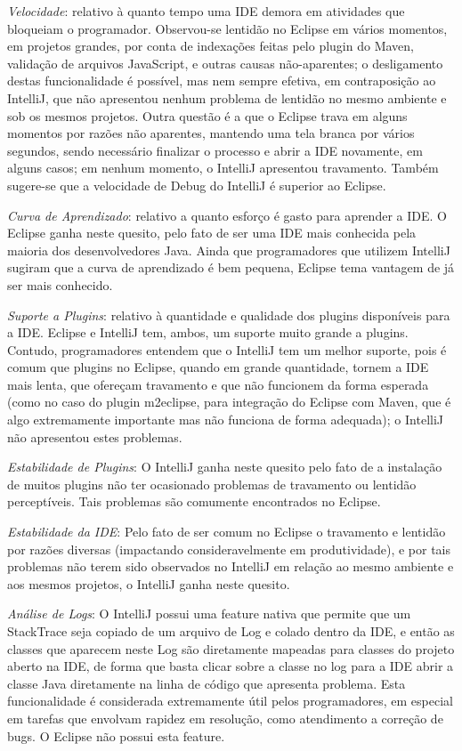 \documentclass[12pt,journal,compsoc]{IEEEtran}
\begin{document}
\emph{Velocidade}: relativo à quanto tempo uma IDE demora em atividades que bloqueiam o programador. Observou-se lentidão no Eclipse em vários momentos, em projetos grandes, por conta de indexações feitas pelo plugin do Maven, validação de arquivos JavaScript, e outras causas não-aparentes; o desligamento destas funcionalidade é possível, mas nem sempre efetiva, em contraposição ao IntelliJ, que não apresentou nenhum problema de lentidão no mesmo ambiente e sob os mesmos projetos. Outra questão é a que o Eclipse trava em alguns momentos por razões não aparentes, mantendo uma tela branca por vários segundos, sendo necessário finalizar o processo e abrir a IDE novamente, em alguns casos; em nenhum momento, o IntelliJ apresentou travamento. Também sugere-se\cite{dropped_eclipse} que a velocidade de Debug do IntelliJ é superior ao Eclipse.

\emph{Curva de Aprendizado}: relativo a quanto esforço é gasto para aprender a IDE. O Eclipse ganha neste quesito, pelo fato de ser uma IDE mais conhecida pela maioria dos desenvolvedores Java. Ainda que programadores que utilizem IntelliJ sugiram que a curva de aprendizado é bem pequena, Eclipse tema vantagem de já ser mais conhecido.

\emph{Suporte a Plugins}: relativo à quantidade e qualidade dos plugins disponíveis para a IDE. Eclipse e IntelliJ tem, ambos, um suporte muito grande a plugins. Contudo, programadores entendem que o IntelliJ tem um melhor suporte, pois é comum que plugins no Eclipse, quando em grande quantidade, tornem a IDE mais lenta, que ofereçam travamento e que não funcionem da forma esperada (como no caso do plugin m2eclipse, para integração do Eclipse com Maven, que é algo extremamente importante mas não funciona de forma adequada); o IntelliJ não apresentou estes problemas.

\emph{Estabilidade de Plugins}: O IntelliJ ganha neste quesito pelo fato de a instalação de muitos plugins não ter ocasionado problemas de travamento ou lentidão perceptíveis. Tais problemas são comumente encontrados no Eclipse.

\emph{Estabilidade da IDE}: Pelo fato de ser comum no Eclipse o travamento e lentidão por razões diversas (impactando consideravelmente em produtividade), e por tais problemas não terem sido observados no IntelliJ em relação ao mesmo ambiente e aos mesmos projetos, o IntelliJ ganha neste quesito.

\emph{Análise de Logs}: O IntelliJ possui uma feature nativa que permite que um StackTrace seja copiado de um arquivo de Log e colado dentro da IDE, e então as classes que aparecem neste Log são diretamente mapeadas para classes do projeto aberto na IDE, de forma que basta clicar sobre a classe no log para a IDE abrir a classe Java diretamente na linha de código que apresenta problema. Esta funcionalidade é considerada extremamente útil pelos programadores, em especial em tarefas que envolvam rapidez em resolução, como atendimento a correção de bugs. O Eclipse não possui esta feature.
\end{document}
